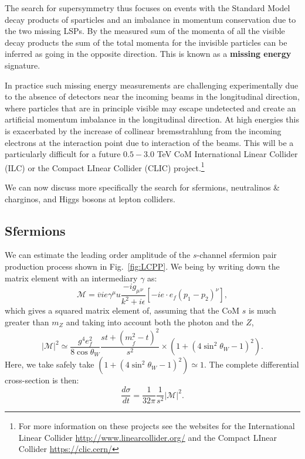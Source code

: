 \documentclass[notes.tex]{subfiles}
\begin{document}
The search for supersymmetry thus focuses on events with the Standard Model decay products of sparticles and an imbalance in momentum conservation due to the two missing LSPs. By the measured sum of the momenta of all the visible decay products the sum of the total momenta for the invisible particles can be inferred as going in the opposite direction. This is known as a {\bf missing energy} signature. 

In practice such missing energy measurements are challenging experimentally due to the absence of detectors near the incoming beams in the longitudinal direction, where particles that are in principle visible may escape undetected and create an artificial momentum imbalance in the longitudinal direction. At high energies this is exacerbated by the increase of collinear bremsstrahlung  from the incoming electrons at the interaction point due to interaction of the beams. This will be a particularly difficult for a future $0.5-3.0$ TeV CoM International Linear Collider (ILC) or the Compact LInear Collider (CLIC) project.\footnote{For more information on these projects see the websites for the International Linear Collider \url{http://www.linearcollider.org/} and the Compact LInear Collider \url{https://clic.cern/}}

We can now discuss more specifically the search for sfermions, neutralinos \& charginos, and Higgs bosons at lepton colliders.


\subsection{Sfermions}
We can estimate the leading order amplitude of the $s$-channel sfermion pair production process shown in Fig.~\ref{fig:LCPP}. We being by writing down the matrix element with an intermediary $\gamma$ as:
\begin{equation}
\mathcal{M} = \overline{v}ie\gamma^\mu u \frac{-ig_\mu{}_\nu}{k^2+i\epsilon}[-ie\cdot e_f (p_1-p_2)^\nu],
\end{equation}
which gives a squared matrix element of, assuming that the CoM  $s$ is much greater than $m_Z$ and taking into account both the photon and the $Z$,
\begin{equation}
|\mathcal{M}|^2 \simeq \frac{g^4 e_f^2}{8\cos\theta_W}\frac{st+(m_{\tilde{f}}^2-t)^2}{s^2}\times (1+(4\sin^2\theta_W-1)^2).
\end{equation}
Here, we take safely take $(1+(4\sin^2\theta_W-1)^2)\simeq1$. The complete differential cross-section is then:
\begin{equation}
\frac{d\sigma}{dt} = \frac{1}{32\pi}\frac{1}{s^2}|\mathcal{M}|^2.
\label{eq:sfermion_production_diff_xsec}
\end{equation}
\end{document}
